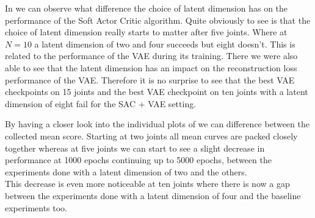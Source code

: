 In  we can observe what difference the choice of latent dimension has on the performance of the Soft Actor Critic algorithm. Quite obviously to see is that the choice of latent dimension really starts to matter after five joints. Where at $N=10$ a latent dimension of two and four succeeds but eight doesn't. This is related to the performance of the VAE during its training. There we were also able to see that the latent dimension has an impact on the reconstruction loss performance of the VAE. Therefore it is no surprise to see that the best VAE checkpoints on 15 joints and the best VAE checkpoint on ten joints with a latent dimension of eight fail for the SAC + VAE setting. 

By having a closer look into the individual plots of  we can difference between the collected mean score. Starting at two joints all mean curves are packed closely together whereas at five joints we can start to see a slight decrease in performance at 1000 epochs continuing up to 5000 epochs, between the experiments done with a latent dimension of two and the others.\\
This decrease is even more noticeable at ten joints where there is now a gap between the experiments done with a latent dimension of four and the baseline experiments too.
